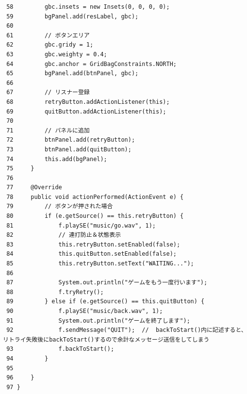 \documentclass[11pt,a4j]{jarticle}
\begin{document}
\begin{small}
\begin{verbatim}
 58         gbc.insets = new Insets(0, 0, 0, 0);
 59         bgPanel.add(resLabel, gbc);
 60 
 61         // ボタンエリア
 62         gbc.gridy = 1;
 63         gbc.weighty = 0.4; 
 64         gbc.anchor = GridBagConstraints.NORTH;
 65         bgPanel.add(btnPanel, gbc);
 66 
 67         // リスナー登録
 68         retryButton.addActionListener(this);
 69         quitButton.addActionListener(this);
 70 
 71         // パネルに追加
 72         btnPanel.add(retryButton);
 73         btnPanel.add(quitButton);
 74         this.add(bgPanel);
 75     }
 76 
 77     @Override
 78     public void actionPerformed(ActionEvent e) {
 79         // ボタンが押された場合
 80         if (e.getSource() == this.retryButton) {
 81             f.playSE("music/go.wav", 1);
 82             // 連打防止＆状態表示
 83             this.retryButton.setEnabled(false);
 84             this.quitButton.setEnabled(false);
 85             this.retryButton.setText("WAITING...");
 86 
 87             System.out.println("ゲームをもう一度行います");
 88             f.tryRetry();
 89         } else if (e.getSource() == this.quitButton) {
 90             f.playSE("music/back.wav", 1);
 91             System.out.println("ゲームを終了します");
 92             f.sendMessage("QUIT");  //  backToStart()内に記述すると、リトライ失敗後にbackToStart()するので余計なメッセージ送信をしてしまう
 93             f.backToStart();
 94         }
 95         
 96     }
 97 }
\end{verbatim}
\end{small}
\end{document}
